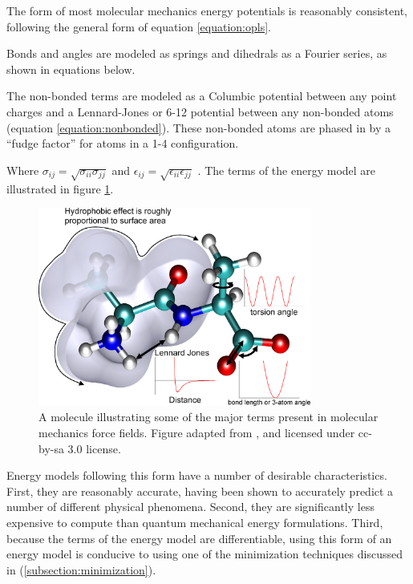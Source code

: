 The form of most molecular mechanics energy potentials is reasonably consistent, following the general form of equation \ref{equation:opls}.

Bonds and angles are modeled as springs and dihedrals as a Fourier series, as shown in equations below.



The non-bonded terms are modeled as a Columbic potential between any point charges and a Lennard-Jones or 6-12 potential between any non-bonded atoms (equation \ref{equation:nonbonded}).
These non-bonded atoms are phased in by a ``fudge factor'' for atoms in a 1-4 configuration.

Where $\sigma_{ij} = \sqrt{\sigma_{ii} \sigma_{jj}}$ and $\epsilon_{ij} = \sqrt{\epsilon_{ii}\epsilon_{jj}}$ \cite{jorgensen1996development}.
The terms of the energy model are illustrated in figure \ref{figure:force_field}.

\begin{figure}
\centering
\includegraphics[width=0.8\textwidth,height=0.8\textwidth,keepaspectratio]{figures/molecular_mechanics_force_field2.png}
\caption{A molecule illustrating some of the major terms present in molecular mechanics force fields.
Figure adapted from \protect\cite{boas2007potential}, and licensed under cc-by-sa 3.0 license.}
\label{figure:force_field}
\end{figure}

Energy models following this form have a number of desirable characteristics.
First, they are reasonably accurate, having been shown to accurately predict a number of different physical phenomena.
Second, they are significantly less expensive to compute than quantum mechanical energy formulations.
Third, because the terms of the energy model are differentiable, using this form of an energy model is conducive to using one of the minimization techniques discussed in  (\ref{subsection:minimization}).
